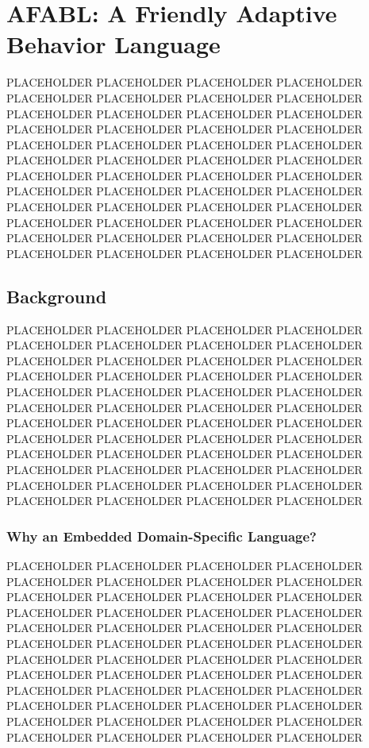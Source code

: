 \chapter{AFABL: A Friendly Adaptive Behavior Language}\label{ch:afabl}

PLACEHOLDER PLACEHOLDER PLACEHOLDER PLACEHOLDER PLACEHOLDER PLACEHOLDER PLACEHOLDER PLACEHOLDER PLACEHOLDER PLACEHOLDER PLACEHOLDER PLACEHOLDER PLACEHOLDER PLACEHOLDER PLACEHOLDER PLACEHOLDER PLACEHOLDER PLACEHOLDER PLACEHOLDER PLACEHOLDER PLACEHOLDER PLACEHOLDER PLACEHOLDER PLACEHOLDER PLACEHOLDER PLACEHOLDER PLACEHOLDER PLACEHOLDER PLACEHOLDER PLACEHOLDER PLACEHOLDER PLACEHOLDER PLACEHOLDER PLACEHOLDER PLACEHOLDER PLACEHOLDER PLACEHOLDER PLACEHOLDER PLACEHOLDER PLACEHOLDER PLACEHOLDER PLACEHOLDER PLACEHOLDER PLACEHOLDER PLACEHOLDER PLACEHOLDER PLACEHOLDER PLACEHOLDER

\section{Background}

PLACEHOLDER PLACEHOLDER PLACEHOLDER PLACEHOLDER PLACEHOLDER PLACEHOLDER PLACEHOLDER PLACEHOLDER PLACEHOLDER PLACEHOLDER PLACEHOLDER PLACEHOLDER PLACEHOLDER PLACEHOLDER PLACEHOLDER PLACEHOLDER PLACEHOLDER PLACEHOLDER PLACEHOLDER PLACEHOLDER PLACEHOLDER PLACEHOLDER PLACEHOLDER PLACEHOLDER PLACEHOLDER PLACEHOLDER PLACEHOLDER PLACEHOLDER PLACEHOLDER PLACEHOLDER PLACEHOLDER PLACEHOLDER PLACEHOLDER PLACEHOLDER PLACEHOLDER PLACEHOLDER PLACEHOLDER PLACEHOLDER PLACEHOLDER PLACEHOLDER PLACEHOLDER PLACEHOLDER PLACEHOLDER PLACEHOLDER PLACEHOLDER PLACEHOLDER PLACEHOLDER PLACEHOLDER

\subsection{Why an Embedded Domain-Specific Language?}

PLACEHOLDER PLACEHOLDER PLACEHOLDER PLACEHOLDER PLACEHOLDER PLACEHOLDER PLACEHOLDER PLACEHOLDER PLACEHOLDER PLACEHOLDER PLACEHOLDER PLACEHOLDER PLACEHOLDER PLACEHOLDER PLACEHOLDER PLACEHOLDER PLACEHOLDER PLACEHOLDER PLACEHOLDER PLACEHOLDER PLACEHOLDER PLACEHOLDER PLACEHOLDER PLACEHOLDER PLACEHOLDER PLACEHOLDER PLACEHOLDER PLACEHOLDER PLACEHOLDER PLACEHOLDER PLACEHOLDER PLACEHOLDER PLACEHOLDER PLACEHOLDER PLACEHOLDER PLACEHOLDER PLACEHOLDER PLACEHOLDER PLACEHOLDER PLACEHOLDER PLACEHOLDER PLACEHOLDER PLACEHOLDER PLACEHOLDER PLACEHOLDER PLACEHOLDER PLACEHOLDER PLACEHOLDER

